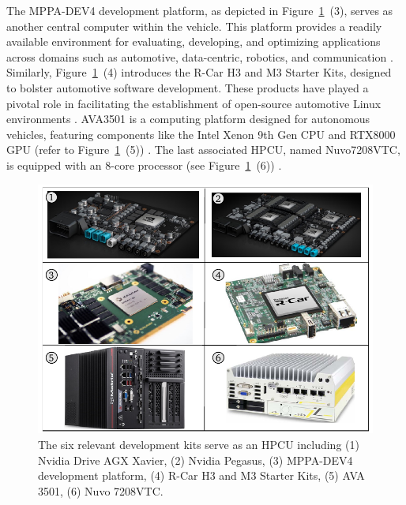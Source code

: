     
    The MPPA-DEV4 development platform, as depicted in Figure~\ref{fig75}~(3), serves as another central computer within the vehicle. This platform provides a readily available environment for evaluating, developing, and optimizing applications across domains such as automotive, data-centric, robotics, and communication \cite{KALRAY}. Similarly, Figure~\ref{fig75}~(4) introduces the R-Car H3 and M3 Starter Kits, designed to bolster automotive software development. These products have played a pivotal role in facilitating the establishment of open-source automotive Linux environments \cite{RENESAS,9613692}.
    AVA3501 is a computing platform designed for autonomous vehicles, featuring components like the Intel Xenon 9th Gen CPU and RTX8000 GPU (refer to Figure~\ref{fig75}~(5)) \cite{AVA}. The last associated HPCU, named Nuvo7208VTC, is equipped with an 8-core processor (see Figure~\ref{fig75}~(6)) \cite{Nuvo}.
    
    \begin{figure}[ht]
    \centering
    \includegraphics[width=1\columnwidth]{figures/HW_analysis.pdf}
    \caption{The six relevant development kits serve as an HPCU including (1) Nvidia Drive AGX Xavier, (2) Nvidia Pegasus, (3) MPPA-DEV4 development platform, (4) R-Car H3 and M3 Starter Kits, (5) AVA 3501, (6) Nuvo 7208VTC.}
    \label{fig75}
    \end{figure}
    
